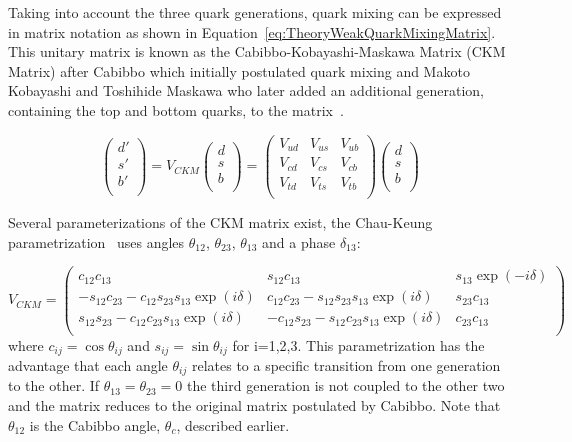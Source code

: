 Taking into account the three quark generations, quark mixing can be expressed in matrix notation as shown in Equation~\ref{eq:TheoryWeakQuarkMixingMatrix}. This unitary matrix is known as the Cabibbo-Kobayashi-Maskawa Matrix (CKM Matrix) after Cabibbo which initially postulated quark mixing and Makoto Kobayashi and Toshihide Maskawa who later added an additional generation, containing the top and bottom quarks, to the matrix~\cite{Theory:CKMKobayashiMaskawa}.

\begin{equation}
\label{eq:TheoryWeakQuarkMixingMatrix}
\begin{pmatrix}
  d' \\
  s' \\
  b' \\
\end{pmatrix}
=
V_{CKM}
\begin{pmatrix}
  d \\
  s \\
  b \\
\end{pmatrix}
=
\begin{pmatrix}
  V_{ud} & V_{us} & V_{ub} \\
  V_{cd} & V_{cs} & V_{cb} \\
  V_{td} & V_{ts} & V_{tb} \\
\end{pmatrix}
\begin{pmatrix}
  d \\
  s \\
  b \\
\end{pmatrix}
\end{equation}

Several parameterizations of the CKM matrix exist, the Chau-Keung parametrization~\cite{Comments} uses angles $\theta_{\textrm{12}}$, $\theta_{\textrm{23}}$, $\theta_{\textrm{13}}$ and a phase $\delta_{\textrm{13}}$:

\begin{equation}
\label{eq:TheoryWeakCKMStandard}
V_{CKM}
=
\begin{pmatrix}
c_{12}c_{13} & s_{12}c_{13} & s_{13}\exp(-i\delta) \\
-s_{12}c_{23}-c_{12}s_{23}s_{13}\exp(i\delta) & c_{12}c_{23} - s_{12}s_{23}s_{13}\exp(i\delta) & s_{23}c_{13} \\ 
s_{12}s_{23}- c_{12}c_{23}s_{13}\exp(i\delta) & -c_{12}s_{23}-s_{12}c_{23}s_{13}\exp(i\delta) & c_{23}c_{13} \\
\end{pmatrix}
\end{equation}
%
where $c_{ij}=\cos\theta_{ij}$ and $s_{ij}=\sin\theta_{ij}$ for i=1,2,3. This parametrization has the advantage that each angle $\theta_{ij}$ relates to a specific transition from one generation to the other. If $\theta_{13} = \theta_{23} = 0$ the third generation is not coupled to the other two and the matrix reduces to the original matrix postulated by Cabibbo. Note that $\theta_{12}$ is the Cabibbo angle, $\theta_c$, described earlier.

